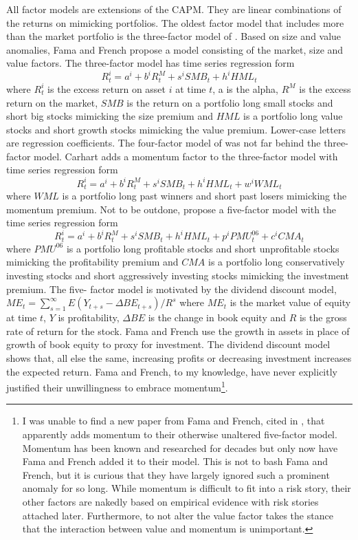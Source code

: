 All factor models are extensions of the CAPM. They are linear combinations of the returns
on mimicking portfolios. The oldest factor model that includes more than the market
portfolio is the three-factor model of \textcite{fama1993common}. Based on size and value
anomalies, Fama and French propose a model consisting of the market, size and value
factors. The three-factor model has time series regression form
\[
R_t^i=a^i+b^iR_t^M+s^iSMB_t+h^iHML_t
\]
where $R_t^i$ is the excess return on asset $i$ at time $t$, a is the alpha, $R^M$ is the
excess return on the market, $SMB$ is the return on a portfolio long small stocks and
short big stocks mimicking the size premium and $HML$ is a portfolio long value stocks and
short growth stocks mimicking the value premium. Lower-case letters are regression
coefficients. The four-factor model of \textcite{carhart1997persistence} was not far
behind the three-factor model. Carhart adds a momentum factor to the three-factor model
with time series regression form
\[
R_t^i=a^i+b^iR_t^M+s^iSMB_t+h^iHML_t+w^iWML_t
\]
where $WML$ is a portfolio long past winners and short past losers mimicking the momentum
premium. Not to be outdone, \textcite{fama2015five} propose a five-factor model with the
time series regression form
\[
R_t^i=a^i+b^iR_t^M+s^iSMB_t+h^iHML_t+p^iPMU_t^{06}+c^iCMA_t
\]
where $PMU^{06}$ is a portfolio long profitable stocks and short unprofitable stocks
mimicking the profitability premium and $CMA$ is a portfolio long conservatively investing
stocks and short aggressively investing stocks mimicking the investment premium. The five-
factor model is motivated by the dividend discount model,
$ME_t=\sum_{s=1}^{\infty}{E\left(Y_{t+s}-\Delta BE_{t+s}\right)/R^s}$ where $ME_t$ is the
market value of equity at time $t$, $Y$ is profitability, $\Delta BE$ is the change in
book equity and $R$ is the gross rate of return for the stock. Fama and French use the
growth in assets in place of growth of book equity to proxy for investment. The dividend
discount model shows that, all else the same, increasing profits or decreasing investment
increases the expected return. Fama and French, to my knowledge, have never explicitly
justified their unwillingness to embrace momentum\footnote{I was unable to find a new
paper from Fama and French, cited in \textcite{barillas2017model}, that apparently adds
momentum to their otherwise unaltered five-factor model. Momentum has been known and
researched for decades but only now have Fama and French added it to their model. This is
not to bash Fama and French, but it is curious that they have largely ignored such a
prominent anomaly for so long. While momentum is difficult to fit into a risk story, their
other factors are nakedly based on empirical evidence with risk stories attached later.
Furthermore, to not alter the value factor takes the stance that the interaction between
value and momentum is unimportant.}.

